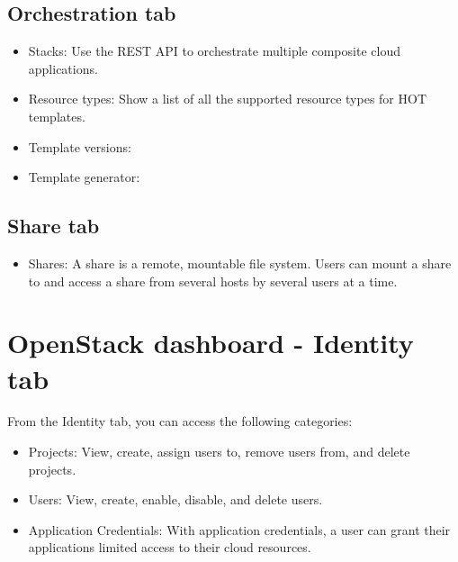 \subsection*{\texorpdfstring{Orchestration
tab}{Orchestration tab}}\label{orchestration-tab}

\begin{itemize}
\item
  Stacks: Use the REST API to orchestrate multiple composite cloud applications.
\item
  Resource types: Show a list of all the supported resource types for HOT templates.
\item
  Template versions:
\item
  Template generator:
\end{itemize}

\subsection*{\texorpdfstring{Share
tab}{Shares tab}}\label{shares-tab}

\begin{itemize}
\item
  Shares: A share is a remote, mountable file system. Users can mount a share to and access a share from several hosts by several users at a time.
\end{itemize}

\section*{OpenStack dashboard - Identity
tab}\label{openstack-dashboard---identity-tab}

From the Identity tab, you can access the following categories:

\begin{itemize}
\item
  Projects: View, create, assign users to, remove users from, and delete
  projects.
\item
  Users: View, create, enable, disable, and delete users.
\item
  Application Credentials: With application credentials, a user can grant their applications limited access to their cloud resources.
\end{itemize}

